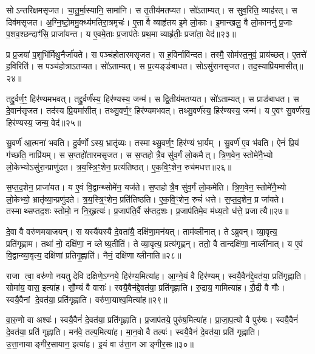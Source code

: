 सोऽन्तरि॑क्षमसृजत।
चा॒तु॒र्मा॒स्यानि॒ सामा॑नि।
स तृ॒तीय॑मतप्यत।
सो॑ऽताम्यत्।
स सुव॒रिति॒ व्याह॑रत्।
स दिव॑मसृजत।
अ॒ग्नि॒ष्टो॒ममु॒क्थ्य॑मतिरा॒त्रमृचः॑।
ए॒ता वै व्याहृ॑तय इ॒मे लो॒काः।
इ॒मान्खलु॒ वै लो॒काननु॑ प्र॒जाः प॒शव॒श्छन्दाꣳ॑सि॒ प्राजा॑यन्त।
य ए॒वमे॒ताः प्र॒जाप॑तेः प्रथ॒मा व्याहृ॑तीः॒ प्रजा॑ता॒ वेद॑॥२३॥

प्र प्र॒जया॑ प॒शुभि॑र्मिथु॒नैर्जा॑यते।
स पञ्च॑होतारमसृजत।
स ह॒विर्नावि॑न्दत।
तस्मै॒ सोम॑स्त॒नुवं॒ प्राय॑च्छत्।
ए॒तत्ते॑ ह॒विरिति॑।
स पञ्च॑होत्रा\-ऽतप्यत।
सो॑ऽताम्यत्।
स प्र॒त्यङ्ङ॑बाधत।
सोऽसु॑रानसृजत।
तद॒स्याप्रि॑यमासीत्॥२४॥

तद्दु॒र्वर्ण॒ꣳ॒ हिर॑ण्यमभवत्।
तद्दु॒र्वर्ण॑स्य॒ हिर॑ण्यस्य॒ जन्म॑।
स द्वि॒तीय॑मतप्यत।
सो॑ऽताम्यत्।
स प्राङ॑बाधत।
स दे॒वान॑सृजत।
तद॑स्य प्रि॒यमा॑सीत्।
तथ्सु॒वर्ण॒ꣳ॒ हिर॑ण्यमभवत्।
तथ्सु॒वर्ण॑स्य॒ हिर॑ण्यस्य॒ जन्म॑।
य ए॒वꣳ सु॒वर्ण॑स्य॒ हिर॑ण्यस्य॒ जन्म॒ वेद॑॥२५॥

सु॒वर्ण॑ आ॒त्मना॑ भवति।
दु॒र्वर्णो\-ऽस्य॒ भ्रातृ॑व्यः।
तस्माथ्सु॒वर्ण॒ꣳ॒ हिर॑ण्यं भा॒र्यम्।
सु॒वर्ण॑ ए॒व भ॑वति।
ऐनं॑ प्रि॒यं ग॑च्छति॒ नाप्रि॑यम्।
स स॒प्तहो॑तारमसृजत।
स स॒प्तहोत्रै॒व सु॑व॒र्गं लो॒कमैत्।
त्रि॒ण॒वेन॒ स्तोमे॑नै॒भ्यो लो॒केभ्यो\-ऽसु॑रा॒न्प्राणु॑दत।
त्र॒य॒स्त्रि॒ꣳ॒शेन॒ प्रत्य॑तिष्ठत्।
ए॒क॒वि॒ꣳ॒शेन॒ रुच॑मधत्त॥२६॥

स॒प्त॒द॒शेन॒ प्राजा॑यत।
य ए॒वं वि॒द्वान्थ्सोमे॑न॒ यज॑ते।
स॒प्तहोत्रै॒व सु॑व॒र्गं लो॒कमे॑ति।
त्रि॒ण॒वेन॒ स्तोमे॑नै॒भ्यो लो॒केभ्यो॒ भ्रातृ॑व्या॒न्प्रणु॑दते।
त्र॒य॒स्त्रि॒ꣳ॒शेन॒ प्रति॑तिष्ठति।
ए॒क॒वि॒ꣳ॒शेन॒ रुचं॑ धत्ते।
स॒प्त॒द॒शेन॒ प्र जा॑यते।
तस्माथ्सप्तद॒शः स्तोमो॒ न नि॒र्॒हृत्यः॑।
प्र॒जाप॑ति॒र्वै स॑प्तद॒शः।
प्र॒जाप॑तिमे॒व म॑ध्य॒तो ध॑त्ते॒ प्रजात्यै॥२७॥\anuvakamend[अ॒न॒न्द॒द्भुव॒ इति॒ व्याह॑र॒द्वेदा॑सी॒द्वेदा॑धत्त॒ प्रजात्यै]

दे॒वा वै वरु॑णमयाजयन्।
स यस्यै॑यस्यै दे॒वता॑यै॒ दक्षि॑णा॒मन॑यत्।
ताम॑व्लीनात्।
तेऽब्रुवन्।
व्या॒वृत्य॒ प्रति॑\-गृह्णाम।
तथा॑ नो॒ दक्षि॑णा॒ न व्लेष्य॒तीति॑।
ते व्या॒वृत्य॒ प्रत्य॑गृह्णन्।
ततो॒ वै तान्दक्षि॑णा॒ नाव्ली॑नात्।
य ए॒वं वि॒द्वान्व्या॒वृत्य॒ दक्षि॑णां प्रतिगृ॒ह्णाति॑।
नैनं॒ दक्षि॑णा व्लीनाति॥२८॥

राजा त्वा॒ वरु॑णो नयतु देवि दक्षिणे॒\-ऽग्नये॒ हिर॑ण्य॒मित्या॑ह।
आ॒ग्ने॒यं वै हिर॑ण्यम्।
स्वयै॒वैन॑द्दे॒वत॑या॒ प्रति॑\-गृह्णाति।
सोमा॑य॒ वास॒ इत्या॑ह।
सौ॒म्यं वै वासः॑।
स्वयै॒वैन॑द्दे॒वत॑या॒ प्रति॑\-गृह्णाति।
रु॒द्राय॒ गामित्या॑ह।
रौ॒द्री वै गौः।
स्वयै॒वैनां दे॒वत॑या॒ प्रति॑\-गृह्णाति।
वरु॑णा॒याश्व॒मित्या॑ह॥२९॥

वा॒रु॒णो वा अश्वः॑।
स्वयै॒वैनं॑ दे॒वत॑या॒ प्रति॑\-गृह्णाति।
प्र॒जाप॑तये॒ पुरु॑ष॒मित्या॑ह।
प्रा॒जा॒प॒त्यो वै पुरु॑षः।
स्वयै॒वैनं॑ दे॒वत॑या॒ प्रति॑ गृह्णाति।
मन॑वे॒ तल्प॒मित्या॑ह।
मा॒न॒वो वै तल्पः॑।
स्वयै॒वैनं॑ दे॒वत॑या॒ प्रति॑ गृह्णाति।
उ॒त्ता॒नायाङ्गीर॒सायान॒ इत्या॑ह।
इ॒यं वा उ॑त्ता॒न आङ्गीर॒सः॥३०॥

